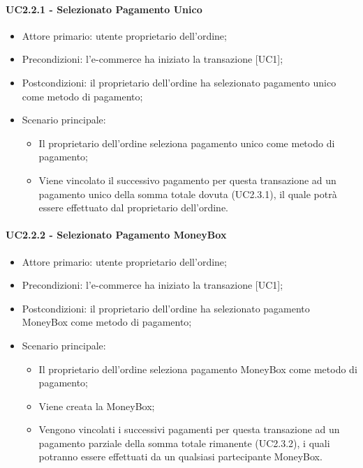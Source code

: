 \paragraph{UC2.2.1 - Selezionato Pagamento Unico}\label{sssec: UC2.2.1}

\begin{itemize}
    \item Attore primario: utente proprietario dell'ordine;
    \item Precondizioni: l'e-commerce\glo{} ha iniziato la transazione [UC1];
    \item Postcondizioni: il proprietario dell'ordine ha selezionato pagamento unico come metodo di pagamento;
    \item Scenario principale: 
        \begin{itemize}
            \item Il proprietario dell'ordine seleziona pagamento unico come metodo di pagamento;
            \item Viene vincolato il successivo pagamento per questa transazione ad un pagamento unico della somma totale dovuta (UC2.3.1), il quale potrà essere effettuato dal proprietario dell'ordine.
        \end{itemize}
\end{itemize}

\paragraph{UC2.2.2 - Selezionato Pagamento MoneyBox}

\begin{itemize}
    \item Attore primario: utente proprietario dell'ordine;
    \item Precondizioni: l'e-commerce\glo{} ha iniziato la transazione [UC1];
    \item Postcondizioni: il proprietario dell'ordine ha selezionato pagamento MoneyBox\glo{} come metodo di pagamento;
    \item Scenario principale: 
        \begin{itemize}
            \item Il proprietario dell'ordine seleziona pagamento MoneyBox\glo{} come metodo di pagamento;
            \item Viene creata la MoneyBox\glo{};
            \item Vengono vincolati i successivi pagamenti per questa transazione ad un pagamento parziale della somma totale rimanente (UC2.3.2), i quali potranno essere effettuati da un qualsiasi partecipante MoneyBox\glo{}.
        \end{itemize}
\end{itemize}

